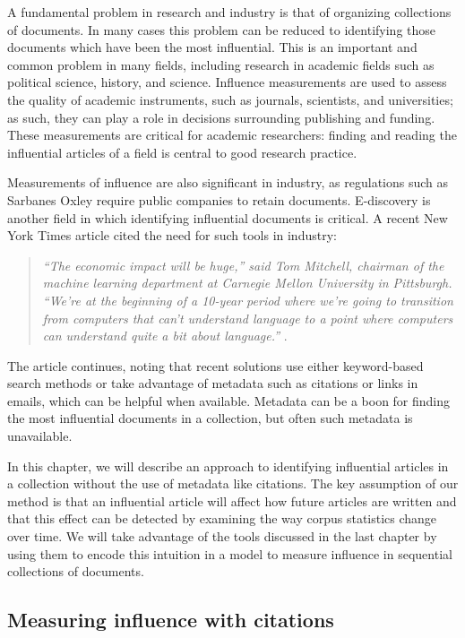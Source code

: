 \label{chapter:influence}

A fundamental problem in research and industry is that of organizing
collections of documents.  In many cases this problem can be reduced
to identifying those documents which have been the most influential.
This is an important and common problem in many fields, including
research in academic fields such as political science, history, and
science.  Influence measurements are used to assess the quality of
academic instruments, such as journals, scientists, and universities;
as such, they can play a role in decisions surrounding publishing and
funding. These measurements are critical for academic researchers:
finding and reading the influential articles of a field is central to
good research practice.

Measurements of influence are also significant in industry, as
regulations such as Sarbanes Oxley require public companies to retain
documents.  E-discovery is another field in which identifying
influential documents is critical.  A recent New York Times article
cited the need for such tools in industry:
\begin{quote}
  \emph{``The economic impact will be huge,'' said Tom Mitchell, chairman
    of the machine learning department at Carnegie Mellon University
    in Pittsburgh. ``We're at the beginning of a 10-year period where
    we're going to transition from computers that can't understand
    language to a point where computers can understand quite a bit
    about language.''} \citep{markoff:2011}.
\end{quote}
The article continues, noting that recent solutions use either
keyword-based search methods or take advantage of metadata such as
citations or links in emails, which can be helpful when available.
Metadata can be a boon for finding the most influential documents in a
collection, but often such metadata is unavailable.

In this chapter, we will describe an approach to identifying
influential articles in a collection without the use of metadata like
citations.  The key assumption of our method is that an influential
article will affect how future articles are written and that this
effect can be detected by examining the way corpus statistics change
over time.  We will take advantage of the tools discussed in the last
chapter by using them to encode this intuition in a model to measure
influence in sequential collections of documents.

\subsection*{Measuring influence with citations}

